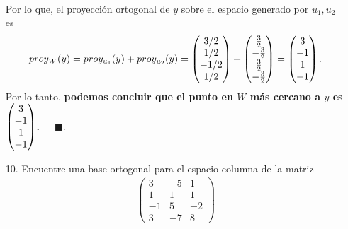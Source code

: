 \documentclass[11pt,letterpaper]{article}
\newcommand{\fin}{$\blacksquare.$}
\begin{document}
\begin{itemize}
\begin{align*}
\end{align*}
Por lo que, el proyección ortogonal de $y$ sobre el espacio generado por $u_1,u_2$ es
\begin{align*}
proy_W (y) = proy_{u_1}(y) + proy_{u_2}(y)=\begin{pmatrix} 3/2\\ 1/2 \\ -1/2\\1/2 \end{pmatrix} + \begin{pmatrix} \frac{3}{2}\\ -\frac{3}{2} \\\frac{3}{2}\\-\frac{3}{2} \end{pmatrix} =\bf \begin{pmatrix}
3\\ -1 \\ 1\\ -1
\end{pmatrix}.
\end{align*}
Por lo tanto, \textbf{podemos concluir que el punto en $W$ más cercano a $y$ es $\bf \begin{pmatrix}
3\\ -1 \\ 1\\ -1
\end{pmatrix}$.}\ \ \ \fin

\item[10.] Encuentre una base ortogonal para el espacio columna de la matriz 
\begin{align*}
\begin{pmatrix}
3 & -5 &1\\
1 & 1 & 1\\
-1 & 5 &-2\\
3 & -7 & 8
\end{pmatrix}
\end{align*}


\end{itemize}
\end{document}
